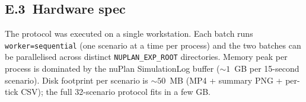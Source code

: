 \subsection*{E.3\ Hardware spec}

The protocol was executed on a single workstation. Each batch runs \texttt{worker=sequential} (one scenario at a time per process) and the two batches can be parallelised across distinct \texttt{NUPLAN\_EXP\_ROOT} directories. Memory peak per process is dominated by the nuPlan SimulationLog buffer ($\sim 1$~GB per 15-second scenario). Disk footprint per scenario is $\sim 50$~MB (MP4 + summary PNG + per-tick CSV); the full 32-scenario protocol fits in a few GB.
